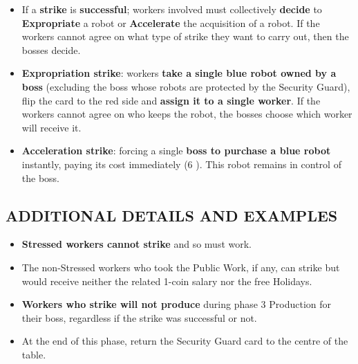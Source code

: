 \begin{itemize}
            owned by a boss, unless the Security Guard is protecting it). The Luddite can
            take the robot card and put it in a robots' rubbish pile (any place on the table,
            just make clear that this robot is not assigned to any player). The destroyed
            robots won't produce coins for anyone, but will count towards the workers'
            collective victory condition together with the expropriated robots. Also, destroying
            robots helps the Luddite to achieve an individual victory: If 3 robots
            get destroyed (over 3 failed strikes), see Luddite's victory conditions.
            \item If a \textbf{strike} is \textbf{successful}; workers involved must collectively \textbf{decide} to \textbf{Expropriate}
            a robot or \textbf{Accelerate} the acquisition of a robot. If the workers cannot
            agree on what type of strike they want to carry out, then the bosses decide.
            \item \textbf{Expropriation strike}: workers \textbf{take a single blue robot owned by a boss}
            (excluding the boss whose robots are protected by the Security Guard), flip
            the card to the red side and \textbf{assign it to a single worker}. If the workers
            cannot agree on who keeps the robot, the bosses choose which worker will
            receive it.
            \item \textbf{Acceleration strike}: forcing a single \textbf{boss to purchase a blue robot} instantly,
            paying its cost immediately (6 \faRubleSign). This robot remains in control of the boss.
        \end{itemize}
    
    \subsection{ADDITIONAL DETAILS AND EXAMPLES}

        \begin{itemize}
            \item \textbf{Stressed workers cannot strike} and so must work.
            \item The non-Stressed workers who took the Public Work, if any, can strike but
            would receive neither the related 1-coin salary nor the free Holidays.
            \item \textbf{Workers who strike will not produce} during phase 3 Production for their
            boss, regardless if the strike was successful or not.
            \item At the end of this phase, return the Security Guard card to the centre of the
            table.
        \end{itemize}

